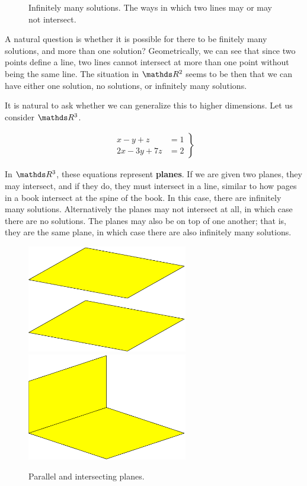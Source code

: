 \documentclass[11pt]{article}
\newcommand{\keyphrase}{\textbf}
\begin{document}
\begin{figure}[t]
\centering
\caption{Infinitely many solutions. The ways in which two lines may or may not intersect.}
\label{fig:lineintersections}
\end{figure}

A natural question is whether it is possible for there to be finitely many solutions, and more than one solution? Geometrically, we can see that since two points define a line, two lines cannot intersect at more than one point without being the same line. The situation in $\bbR^2$ seems to be then that we can have either one solution, no solutions, or infinitely many solutions.

It is natural to ask whether we can generalize this to higher dimensions. Let us consider $\bbR^3$.

\begin{align*}
\left.
\begin{aligned}
x - y + z &= 1
\\
2x - 3y + 7z &= 2
\end{aligned}
\right\}
\end{align*}

In $\bbR^3$, these equations represent \keyphrase{planes}. If we are given two planes, they may intersect, and if they do, they must intersect in a line, similar to how pages in a book intersect at the spine of the book. In this case, there are infinitely many solutions. Alternatively the planes may not intersect at all, in which case there are no solutions. The planes may also be on top of one another; that is, they are the same plane, in which case there are also infinitely many solutions.

\begin{figure}[H]
\centering
\includegraphics[width=7cm]{parallelplanes.eps}
\hspace{.5cm}
\includegraphics[width=7cm]{intersectingplanes.eps}
\caption{Parallel and intersecting planes.}
\end{figure}
\end{document}
